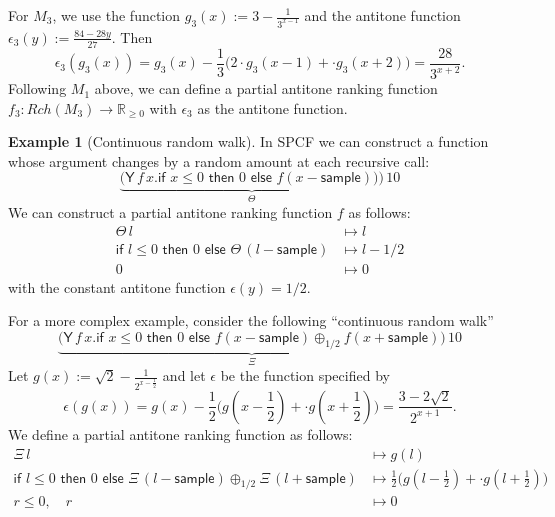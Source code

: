 \documentclass{article}
\newcommand{\nnReal}{\mathbb{R}_{{\geq}0}}
\newcommand{\tY}{\textsf{Y}}
\newcommand{\tif}[3]{\textsf{if }#1\textsf{ then }#2\textsf{ else }#3}
\newcommand{\tsample}{\textsf{sample}}
\theoremstyle{definition}
\newtheorem{example}{Example}
\theoremstyle{lemma}
\theoremstyle{remark}
\begin{document}
For $M_3$, we use the function $g_3(x) := 3 - \frac{1}{3^{x-1}}$ and the antitone function $\epsilon_3(y) := \frac{84-28y}{27}$. 
Then
\[
\epsilon_3(g_3(x)) = g_3(x) - \dfrac{1}{3}\big(2 \cdot g_3(x-1) + \cdot g_3(x+2) \big) = 
\frac{28}{3^{x+2}}.
\]
Following $M_1$ above, we can define a partial antitone ranking function $f_3 : \mathit{Rch}(M_3) \to \nnReal$ with $\epsilon_3$ as the antitone function.

\begin{example}[Continuous random walk]\label{ex:raven complex}
In SPCF we can construct a function whose argument changes by a random amount at each recursive call:
\[
\underbrace{\big
(\tY \, f \, x . \tif{x \leq 0}{0}{f(x - \tsample))} \big)}_{\Theta} \, 10
\]
We can construct a partial antitone ranking function $f$ as follows:
\begin{align*}
\Theta \, l 
&\mapsto 
l
\\
\tif{l \leq 0}{0}{\Theta \, (l - \tsample)}
&\mapsto
l - 1/2
\\
0 &\mapsto 0
\end{align*}
with the constant antitone function $\epsilon(y) = 1/2$.

For a more complex example, consider the following ``continuous random walk''
\[
\underbrace{\big
(\tY \, f \, x . \tif{x \leq 0}{0}{f(x - \tsample) \oplus_{1/2} f(x + \tsample)} \big)}_{\Xi} \, 10
\]
Let $g(x) := \sqrt{2} - \frac{1}{2^{x-\frac{1}{2}}}$ and let $\epsilon$ be the function specified by
\[
\epsilon(g(x)) = g(x) - \dfrac{1}{2}\Big(g(x - \dfrac{1}{2}) + \cdot g(x + \dfrac{1}{2}) \Big) = 
\dfrac{3 - 2\sqrt{2}}{2^{x+1}}.
\]
We define a partial antitone ranking function as follows:
\begin{align*}
\Xi \, l 
&\mapsto 
g(l)
\\
\tif{l \leq 0}{0}{\Xi \, (l - \tsample) \oplus_{1/2} \Xi \, (l + \tsample)}
&\mapsto
\frac{1}{2}\big(g(l - \frac{1}{2}) + \cdot g(l + \frac{1}{2}) \big)
\\
r \leq 0, \quad r &\mapsto 0
\end{align*}
\end{example}
\end{document}
